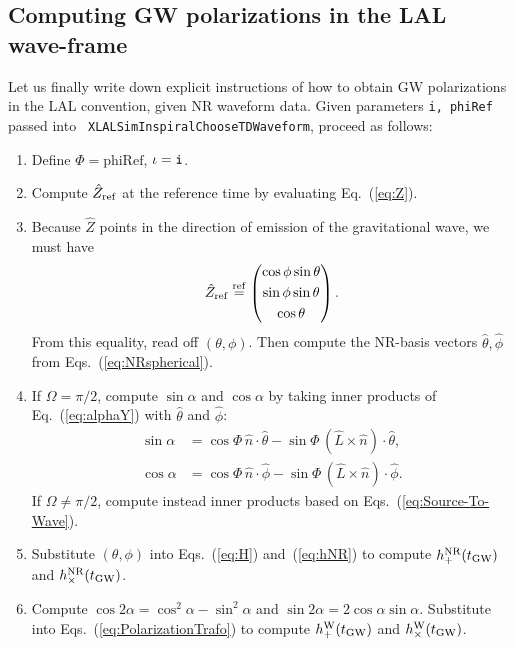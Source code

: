 \documentclass[11pt,tightenlines,article,amssymb,amsmath,amsfonts,superscriptaddress,nofootinbib]{revtex4}
\newcommand{\tNR}{\theta}
\newcommand{\pNR}{\phi}
\newcommand{\EtNR}{{\hat\theta}}
\newcommand{\EpNR}{{\hat\phi}}
\newcommand{\hpNR}{h_+^{\rm NR}}
\newcommand{\hcNR}{h_{\times}^{\rm NR}}
\newcommand{\nNR}{\hat{n}}
\newcommand{\lNR}{\hat L}
\newcommand{\tGW}{t_{\rm GW}}
\newcommand{\EzW}{\hat Z}
\newcommand{\hpW}{h_+^{\rm W}}
\newcommand{\hcW}{h_\times^{\rm W}}
\newcommand{\phiRef}{\Phi} %
\newcommand{\equalref}{\overset{\rm ref}{=}}
\begin{document}
\subsection{Computing GW polarizations in the LAL wave-frame}
\label{sec:NR-LAL-Trafo}
Let us finally write down explicit instructions of how to obtain GW
polarizations in the LAL convention, given NR waveform data.  
Given parameters {\tt i, phiRef} passed into {\tt
XLALSimInspiralChooseTDWaveform}, proceed as follows:

\begin{enumerate}
\item Define $\phiRef=\mbox{phiRef}$, $\iota={\tt i}$.
\item Compute $\EzW_{\rm ref}$ at the reference time by evaluating Eq.~(\ref{eq:Z}).
\item Because $\EzW$ points in the direction of emission of the
gravitational wave, we must have
\begin{equation}
  \EzW_{\rm ref} \equalref
  \left(\begin{gathered}
    \cos\pNR\sin\tNR\\
    \sin\pNR\sin\tNR\\
    \cos\tNR\end{gathered}
    \right).
\end{equation}
From this equality, read off $(\tNR, \pNR)$.  Then compute the
NR-basis vectors $\EtNR, \EpNR$ from Eqs.~(\ref{eq:NRspherical}).
\item If $\Omega=\pi/2$, compute $\sin\alpha$ and $\cos\alpha$ by taking inner products
  of Eq.~(\ref{eq:alphaY}) with $\EtNR$ and $\EpNR$:
  \begin{subequations}
  \begin{align}
    \sin\alpha& = \cos\phiRef\,\nNR\cdot\EtNR- \sin\phiRef\,(\lNR\times\nNR)\cdot\EtNR,\\
    \cos\alpha& = \cos\phiRef\,\nNR\cdot\EpNR - \sin\phiRef\,(\lNR\times\nNR)\cdot\EpNR.
  \end{align}
\end{subequations}
  If $\Omega\neq \pi/2$, compute instead inner products based on
  Eqs.~(\ref{eq:Source-To-Wave}).
\item Substitute $(\tNR, \pNR)$ into Eqs.~(\ref{eq:H})
  and~(\ref{eq:hNR}) to compute $\hpNR(\tGW)$ and $\hcNR(\tGW)$.
\item Compute $\cos 2\alpha=\cos^2\alpha\!-\!\sin^2\alpha$ and $\sin 2\alpha=2\cos\alpha\sin\alpha$.  Substitute into Eqs.~(\ref{eq:PolarizationTrafo}) to compute $\hpW(\tGW)$ and $\hcW(\tGW)$.
\end{enumerate}
\end{document}
